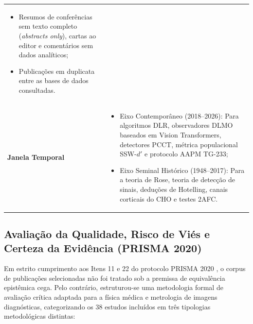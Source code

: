 \documentclass[
  12pt,
  a4paper,
  oneside
]{report}
\begin{document}
\begin{table}[htbp]
\begin{tabularx}{\textwidth}{>{\RaggedRight\bfseries}p{} >{\RaggedRight\arraybackslash}X}
\begin{itemize}[leftmargin=*,noitemsep,topsep=0pt]
      \item Resumos de conferências sem texto completo (\emph{abstracts only}), cartas ao editor e comentários sem dados analíticos;
      \item Publicações em duplicata entre as bases de dados consultadas.
    \end{itemize} \\
    \addlinespace[0.4em]
    Janela Temporal & 
    \begin{itemize}[leftmargin=*,noitemsep,topsep=0pt]
      \item Eixo Contemporâneo (2018--2026): Para algoritmos DLR, observadores DLMO baseados em Vision Transformers, detectores PCCT, métrica populacional SSW-$d'$ e protocolo AAPM TG-233;
      \item Eixo Seminal Histórico (1948--2017): Para a teoria de Rose, teoria de detecção de sinais, deduções de Hotelling, canais corticais do CHO e testes 2AFC.
    \end{itemize} \\
    \bottomrule
  \end{tabularx}
  \vspace{0.3em}\par{}
\end{table}

\subsection{Avaliação da Qualidade, Risco de Viés e Certeza da Evidência (PRISMA 2020)}
\label{subsec:avaliacao_risco_vies_metodologia}
Em estrito cumprimento aos Itens 11 e 22 do protocolo PRISMA 2020 \cite{page2021}, o corpus de publicações selecionadas não foi tratado sob a premissa de equivalência epistêmica cega. Pelo contrário, estruturou-se uma metodologia formal de avaliação crítica adaptada para a física médica e metrologia de imagens diagnósticas, categorizando os 38 estudos incluídos em três tipologias metodológicas distintas:
\end{document}
